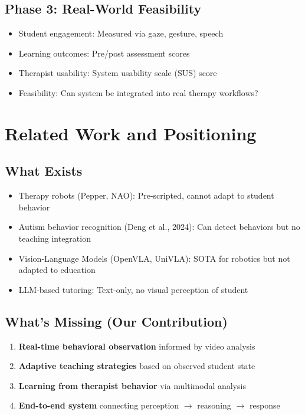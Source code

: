 \documentclass[12pt, a4paper]{article}
\begin{document}
\subsection{Phase 3: Real-World Feasibility}

\begin{itemize}
    \item Student engagement: Measured via gaze, gesture, speech
    \item Learning outcomes: Pre/post assessment scores
    \item Therapist usability: System usability scale (SUS) score
    \item Feasibility: Can system be integrated into real therapy workflows?
\end{itemize}

\section{Related Work and Positioning}

\subsection{What Exists}

\begin{itemize}
    \item Therapy robots (Pepper, NAO): Pre-scripted, cannot adapt to student behavior
    \item Autism behavior recognition (Deng et al., 2024): Can detect behaviors but no teaching integration
    \item Vision-Language Models (OpenVLA, UniVLA): SOTA for robotics but not adapted to education
    \item LLM-based tutoring: Text-only, no visual perception of student
\end{itemize}

\subsection{What's Missing (Our Contribution)}

\begin{enumerate}
    \item \textbf{Real-time behavioral observation} informed by video analysis
    \item \textbf{Adaptive teaching strategies} based on observed student state
    \item \textbf{Learning from therapist behavior} via multimodal analysis
    \item \textbf{End-to-end system} connecting perception $\rightarrow$ reasoning $\rightarrow$ response
\end{enumerate}
\end{document}
